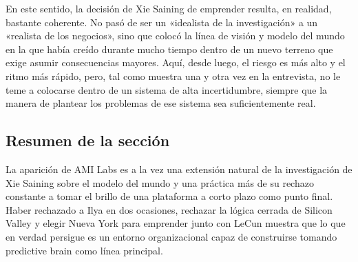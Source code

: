 En este sentido, la decisión de Xie Saining de emprender resulta, en realidad, bastante coherente. No pasó de ser un «idealista de la investigación» a un «realista de los negocios», sino que colocó la línea de visión y modelo del mundo en la que había creído durante mucho tiempo dentro de un nuevo terreno que exige asumir consecuencias mayores. Aquí, desde luego, el riesgo es más alto y el ritmo más rápido, pero, tal como muestra una y otra vez en la entrevista, no le teme a colocarse dentro de un sistema de alta incertidumbre, siempre que la manera de plantear los problemas de ese sistema sea suficientemente real.

\subsection{Resumen de la sección}

La aparición de AMI Labs es a la vez una extensión natural de la investigación de Xie Saining sobre el modelo del mundo y una práctica más de su rechazo constante a tomar el brillo de una plataforma a corto plazo como punto final. Haber rechazado a Ilya en dos ocasiones, rechazar la lógica cerrada de Silicon Valley y elegir Nueva York para emprender junto con LeCun muestra que lo que en verdad persigue es un entorno organizacional capaz de construirse tomando predictive brain como línea principal.

